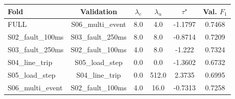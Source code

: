 \begin{tabular}{lccccc}
\hline
Fold & Validation & $\lambda_c$ & $\lambda_u$ & $\tau^\star$ & Val. $F_1$ \\
\hline
FULL & S06\_multi\_event & 8.0 & 4.0 & -1.1797 & 0.7468 \\
S02\_fault\_100ms & S03\_fault\_250ms & 8.0 & 8.0 & -0.8714 & 0.7209 \\
S03\_fault\_250ms & S02\_fault\_100ms & 4.0 & 8.0 & -1.222 & 0.7324 \\
S04\_line\_trip & S05\_load\_step & 0.0 & 0.0 & -1.3602 & 0.6732 \\
S05\_load\_step & S04\_line\_trip & 0.0 & 512.0 & 2.3735 & 0.6995 \\
S06\_multi\_event & S02\_fault\_100ms & 4.0 & 16.0 & -0.7313 & 0.7258 \\
\hline
\end{tabular}
